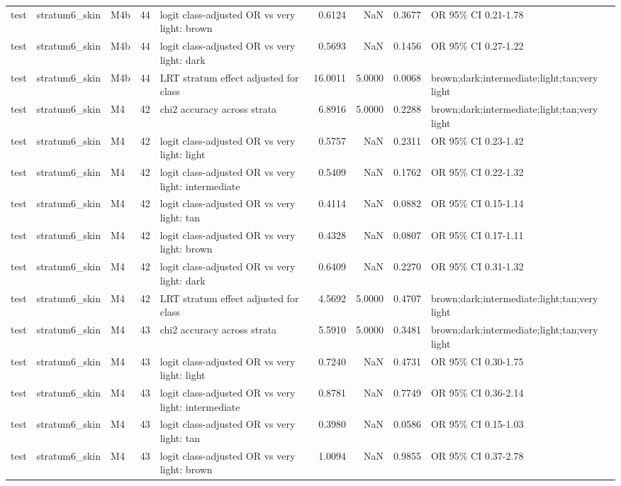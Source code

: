 \begin{tabular}{lllrlrrrl}
test & stratum6\_skin & M4b & 44 & logit class-adjusted OR vs very light: brown & 0.6124 & NaN & 0.3677 & OR 95\% CI 0.21-1.78 \\
test & stratum6\_skin & M4b & 44 & logit class-adjusted OR vs very light: dark & 0.5693 & NaN & 0.1456 & OR 95\% CI 0.27-1.22 \\
test & stratum6\_skin & M4b & 44 & LRT stratum effect adjusted for class & 16.0011 & 5.0000 & 0.0068 & brown;dark;intermediate;light;tan;very light \\
test & stratum6\_skin & M4 & 42 & chi2 accuracy across strata & 6.8916 & 5.0000 & 0.2288 & brown;dark;intermediate;light;tan;very light \\
test & stratum6\_skin & M4 & 42 & logit class-adjusted OR vs very light: light & 0.5757 & NaN & 0.2311 & OR 95\% CI 0.23-1.42 \\
test & stratum6\_skin & M4 & 42 & logit class-adjusted OR vs very light: intermediate & 0.5409 & NaN & 0.1762 & OR 95\% CI 0.22-1.32 \\
test & stratum6\_skin & M4 & 42 & logit class-adjusted OR vs very light: tan & 0.4114 & NaN & 0.0882 & OR 95\% CI 0.15-1.14 \\
test & stratum6\_skin & M4 & 42 & logit class-adjusted OR vs very light: brown & 0.4328 & NaN & 0.0807 & OR 95\% CI 0.17-1.11 \\
test & stratum6\_skin & M4 & 42 & logit class-adjusted OR vs very light: dark & 0.6409 & NaN & 0.2270 & OR 95\% CI 0.31-1.32 \\
test & stratum6\_skin & M4 & 42 & LRT stratum effect adjusted for class & 4.5692 & 5.0000 & 0.4707 & brown;dark;intermediate;light;tan;very light \\
test & stratum6\_skin & M4 & 43 & chi2 accuracy across strata & 5.5910 & 5.0000 & 0.3481 & brown;dark;intermediate;light;tan;very light \\
test & stratum6\_skin & M4 & 43 & logit class-adjusted OR vs very light: light & 0.7240 & NaN & 0.4731 & OR 95\% CI 0.30-1.75 \\
test & stratum6\_skin & M4 & 43 & logit class-adjusted OR vs very light: intermediate & 0.8781 & NaN & 0.7749 & OR 95\% CI 0.36-2.14 \\
test & stratum6\_skin & M4 & 43 & logit class-adjusted OR vs very light: tan & 0.3980 & NaN & 0.0586 & OR 95\% CI 0.15-1.03 \\
test & stratum6\_skin & M4 & 43 & logit class-adjusted OR vs very light: brown & 1.0094 & NaN & 0.9855 & OR 95\% CI 0.37-2.78 \\

\end{tabular}
